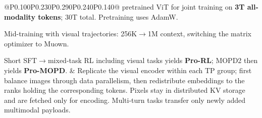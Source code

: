 \begin{longtable}{@{}P{0.100\dimexpr\textwidth-40pt\relax}P{0.230\dimexpr\textwidth-40pt\relax}P{0.290\dimexpr\textwidth-40pt\relax}P{0.240\dimexpr\textwidth-40pt\relax}P{0.140\dimexpr\textwidth-40pt\relax}@{}}
pretrained ViT for joint training on {\bfseries 3T all-\allowbreak{}modality tokens}; 30T total.\allowbreak{} Pretraining uses AdamW.\allowbreak{}\par{} Mid-\allowbreak{}training with visual trajectories: 256K\(\rightarrow\)1M context, switching the matrix optimizer to Muown.\allowbreak{}\par{} Short SFT\(\rightarrow\)mixed-\allowbreak{}task RL including visual tasks yields {\bfseries Pro-\allowbreak{}RL}; MOPD2 then yields {\bfseries Pro-\allowbreak{}MOPD}.\allowbreak{} & Replicate the visual encoder within each TP group; first balance images through data parallelism, then redistribute embeddings to the ranks holding the corresponding tokens.\allowbreak{} Pixels stay in distributed KV storage and are fetched only for encoding.\allowbreak{} Multi-\allowbreak{}turn tasks transfer only newly added multimodal payloads.\allowbreak{} \\
\addlinespace[6pt]

\end{longtable}
